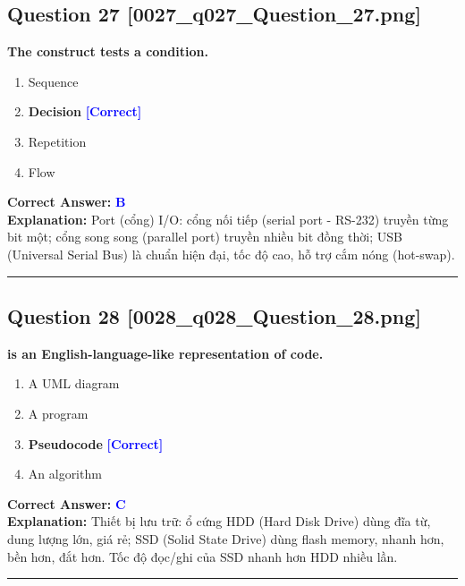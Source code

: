 \documentclass[11pt,a4paper]{article}
\begin{document}
\begin{minipage}{\textwidth}
\subsection*{Question 27 \quad \footnotesize{[0027\_q027\_Question\_27.png]}}
\noindent \textbf{The construct tests a condition.}

\begin{enumerate}[label=\Alph*.]
    \item Sequence
    \item \textbf{Decision} \hfill \textcolor{blue}{\textbf{[Correct]}}
    \item Repetition
    \item Flow
\end{enumerate}

\noindent \textbf{Correct Answer:} \textcolor{blue}{\textbf{B}} \\[2pt]
\noindent \textbf{Explanation:} Port (cổng) I/O: cổng nối tiếp (serial port - RS-232) truyền từng bit một; cổng song song (parallel port) truyền nhiều bit đồng thời; USB (Universal Serial Bus) là chuẩn hiện đại, tốc độ cao, hỗ trợ cắm nóng (hot-swap).

\par\vspace{0.3cm}
\hrule
\vspace{0.3cm}
\end{minipage}

\begin{minipage}{\textwidth}
\subsection*{Question 28 \quad \footnotesize{[0028\_q028\_Question\_28.png]}}
\noindent \textbf{is an English-language-like representation of code.}

\begin{enumerate}[label=\Alph*.]
    \item A UML diagram
    \item A program
    \item \textbf{Pseudocode} \hfill \textcolor{blue}{\textbf{[Correct]}}
    \item An algorithm
\end{enumerate}

\noindent \textbf{Correct Answer:} \textcolor{blue}{\textbf{C}} \\[2pt]
\noindent \textbf{Explanation:} Thiết bị lưu trữ: ổ cứng HDD (Hard Disk Drive) dùng đĩa từ, dung lượng lớn, giá rẻ; SSD (Solid State Drive) dùng flash memory, nhanh hơn, bền hơn, đắt hơn. Tốc độ đọc/ghi của SSD nhanh hơn HDD nhiều lần.

\par\vspace{0.3cm}
\hrule
\vspace{0.3cm}
\end{minipage}
\end{document}
